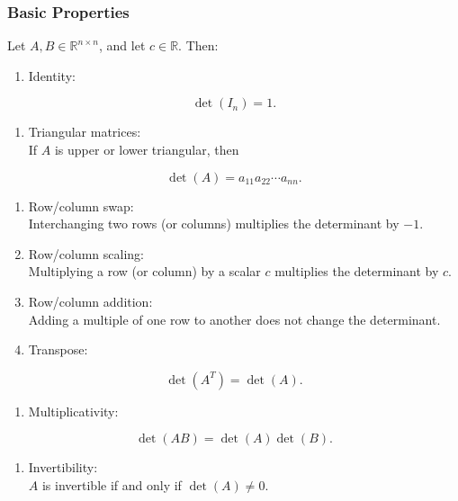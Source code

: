 \documentclass[
  12pt,
  a4paper,
]{article}
\begin{document}
\subsubsection{Basic Properties}\label{basic-properties}

Let \(A, B \in \mathbb{R}^{n \times n}\), and let \(c \in \mathbb{R}\).
Then:

\begin{enumerate}
\def\labelenumi{\arabic{enumi}.}
\item
  Identity:
\end{enumerate}

\[\det(I_n) = 1.\]

\begin{enumerate}
\def\labelenumi{\arabic{enumi}.}
\item
  Triangular matrices:\\
  If \(A\) is upper or lower triangular, then
\end{enumerate}

\[\det(A) = a_{11} a_{22} \cdots a_{nn}.\]

\begin{enumerate}
\def\labelenumi{\arabic{enumi}.}
\item
  Row/column swap:\\
  Interchanging two rows (or columns) multiplies the determinant by
  \(-1\).
\item
  Row/column scaling:\\
  Multiplying a row (or column) by a scalar \(c\) multiplies the
  determinant by \(c\).
\item
  Row/column addition:\\
  Adding a multiple of one row to another does not change the
  determinant.
\item
  Transpose:
\end{enumerate}

\[\det(A^T) = \det(A).\]

\begin{enumerate}
\def\labelenumi{\arabic{enumi}.}
\item
  Multiplicativity:
\end{enumerate}

\[\det(AB) = \det(A)\det(B).\]

\begin{enumerate}
\def\labelenumi{\arabic{enumi}.}
\item
  Invertibility:\\
  \(A\) is invertible if and only if \(\det(A) \neq 0\).
\end{enumerate}
\end{document}

